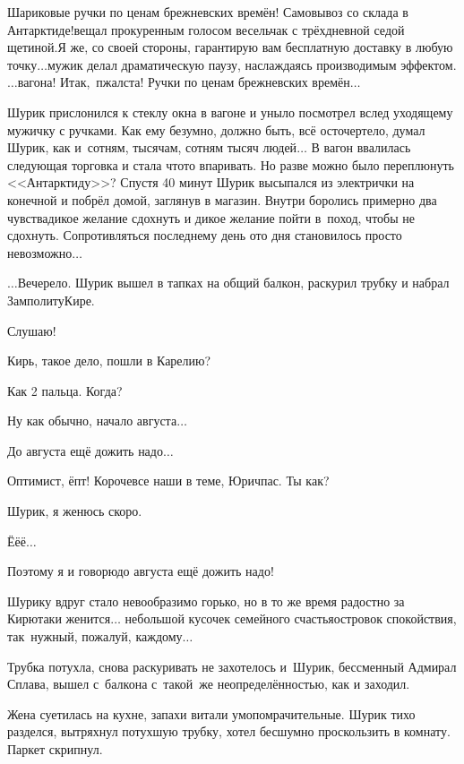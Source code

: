 {\diagdash Шариковые ручки по ценам брежневских времён! Самовывоз со склада в Антарктиде!\mdash вещал прокуренным голосом весельчак с трёхдневной седой щетиной.\mdash Я же, со своей стороны, гарантирую вам бесплатную доставку в любую точку$\ldots$\mdash мужик делал драматическую паузу, наслаждаясь производимым эффектом.\mdash $\ldots$вагона! Итак,~пжалста! Ручки по ценам брежневских времён$\ldots$

Шурик прислонился к стеклу окна в вагоне и уныло посмотрел вслед уходящему мужичку с ручками. Как ему безумно, должно быть, всё осточертело, думал Шурик, как и~сотням, тысячам, сотням тысяч людей$\ldots$ В вагон ввалилась следующая торговка и стала что\sdash то впаривать. Но разве можно было переплюнуть <<Антарктиду>>? Спустя 40 минут Шурик высыпался из электрички на конечной и побрёл домой, заглянув в магазин. Внутри боролись примерно два чувства\mdash дикое желание сдохнуть и дикое желание пойти в~поход, чтобы не сдохнуть. Сопротивляться последнему день ото дня становилось просто невозможно$\ldots$

$\ldots$Вечерело. Шурик вышел в тапках на общий балкон, раскурил трубку и набрал Замполиту\mdash Кире.

\diagdash Слушаю!

\diagdash Кирь, такое дело, пошли в Карелию?

\diagdash Как 2 пальца. Когда?

\diagdash Ну как обычно, начало августа$\ldots$

\diagdash До августа ещё дожить надо$\ldots$

\diagdash Оптимист, ёпт! Короче\mdash все наши в теме, Юрич\mdash пас. Ты как?

\diagdash Шурик, я женюсь скоро.

\diagdash Ё\sdash ё\sdash ё$\ldots$

\diagdash Поэтому я и говорю\mdash до августа ещё дожить надо!

Шурику вдруг стало невообразимо горько, но в то же время радостно за Кирю\mdash таки женится$\ldots$ небольшой кусочек семейного счастья\mdash островок спокойствия, так~нужный, пожалуй, каждому$\ldots$ 

Трубка потухла, снова раскуривать не захотелось и~Шурик, бессменный Адмирал Сплава, вышел с~балкона с~такой~же неопределённостью, как и заходил.

Жена суетилась на кухне, запахи витали умопомрачительные. Шурик тихо разделся, вытряхнул потухшую трубку, хотел бесшумно проскользить в комнату. Паркет скрипнул. 

}
